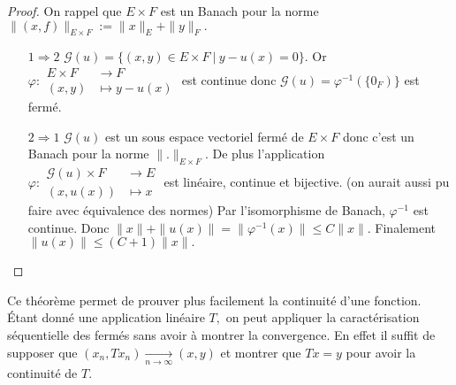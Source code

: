 \begin{proof}
    On rappel que $E\times F$ est un Banach pour la norme $\|(x,f)\|_{E\times F}:=\|x\|_E+\|y\|_F.$
    \begin{itemize}
        \item[$1\Rightarrow 2$] $\mathcal{G}(u)=\{(x,y)\in E\times F\ |\ y-u(x)=0\} $. Or $\varphi  :\begin{aligned}
            E\times F &\longrightarrow F \\
            (x,y) &\longmapsto y-u(x)
        \end{aligned}$ est continue donc $\mathcal{G}(u)=\varphi ^{-1} (\{0_F)\} $ est fermé.
    \item[$2\Rightarrow 1$] $\mathcal{G}(u)$ est un sous espace vectoriel fermé de $E\times F$ donc c'est un Banach pour la norme $\|.\|_{E\times F}.$ De plus l'application $\varphi : \begin{aligned}
         \mathcal{G}(u)\times F&\longrightarrow E \\
         (x,u(x))&\longmapsto x
    \end{aligned}$ est linéaire, continue et bijective. (on aurait aussi pu faire avec équivalence des normes) Par l'isomorphisme de Banach, $\varphi ^{-1} $ est continue. Donc $\|x\|+\|u(x)\|=\|\varphi ^{-1}  (x)\|\le C\|x\|.$ Finalement $\|u(x)\|\le (C+1)\|x\|.$
    \end{itemize}

\end{proof}

Ce théorème permet de prouver plus facilement la continuité d'une fonction. \'Etant donné une application linéaire $T,$ on peut appliquer la caractérisation séquentielle des fermés sans avoir à montrer la convergence. En effet il suffit de supposer que $(x_n, Tx_n)\underset{n\to\infty}{\rightarrow}(x,y)$ et montrer que $Tx=y$ pour avoir la continuité de $T.$
